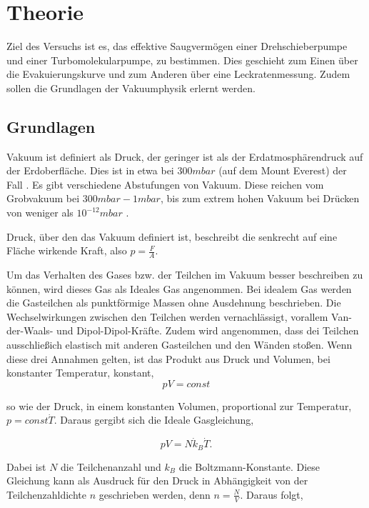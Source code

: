 \section{Theorie}
\label{sec:Theorie}

Ziel des Versuchs ist es, das effektive Saugvermögen einer Drehschieberpumpe und einer Turbomolekularpumpe, zu bestimmen.
Dies geschieht zum Einen über die Evakuierungskurve und zum Anderen über eine Leckratenmessung.
Zudem sollen die Grundlagen der Vakuumphysik erlernt werden.

\subsection{Grundlagen}
\label{sec:Grundlagen}
Vakuum ist definiert als Druck, der geringer ist als der Erdatmosphärendruck auf der Erdoberfläche.
Dies ist in etwa bei $300 mbar$ (auf dem Mount Everest) der Fall \cite{Pfeiffer, S.9}.
Es gibt verschiedene Abstufungen von Vakuum. Diese reichen vom Grobvakuum bei $300 mbar - 1 mbar$, bis zum 
extrem hohen Vakuum bei Drücken von weniger als $10^{-12} mbar$ \cite{Pfeiffer, S.10}.

Druck, über den das Vakuum definiert ist, beschreibt die senkrecht auf eine Fläche wirkende Kraft, also $p = \frac{F}{A}$.

Um das Verhalten des Gases bzw. der Teilchen im Vakuum besser beschreiben zu können, wird dieses Gas als Ideales Gas angenommen.
Bei idealem Gas werden die Gasteilchen als punktförmige Massen ohne Ausdehnung beschrieben. 
Die Wechselwirkungen zwischen den Teilchen werden vernachlässigt, vorallem Van-der-Waals- und Dipol-Dipol-Kräfte.
Zudem wird angenommen, dass dei Teilchen ausschließich elastisch mit anderen Gasteilchen und den Wänden stoßen.
Wenn diese drei Annahmen gelten, ist das Produkt aus Druck und Volumen, bei konstanter Temperatur, konstant, 
    \begin{equation}
    \label{equ:0}
        pV = const 
    \end{equation}
        
so wie der Druck, in einem konstanten Volumen, proportional zur Temperatur, $p = const \dot T$.
Daraus gergibt sich die Ideale Gasgleichung,

    \begin{equation}
    \label{equ:1}
        pV = N \dot k_B \dot T.
    \end{equation}

Dabei ist $N$ die Teilchenanzahl und $k_B$ die Boltzmann-Konstante.
Diese Gleichung kann als Ausdruck für den Druck in Abhängigkeit von der Teilchenzahldichte $n$ geschrieben werden, 
denn $n = \frac{N}{V}$.
Daraus folgt,

